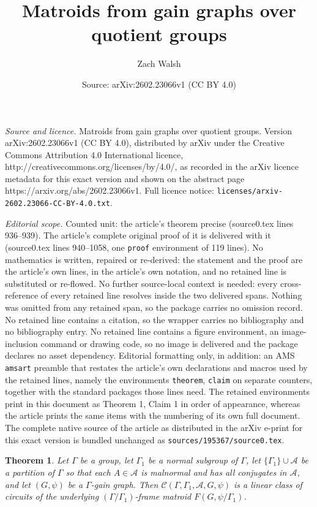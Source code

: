 \documentclass[10pt,a4paper]{amsart}
\title{Matroids from gain graphs over quotient groups}
\author{Zach Walsh}
\date{Source: arXiv:2602.23066v1 (CC BY 4.0)}
\newtheorem{theorem}{Theorem}
\newcommand{\cA}{\mathcal{A}}
\newcommand{\cC}{\mathcal{C}}
\begin{document}
\maketitle

\noindent\emph{Source and licence.} Matroids from gain graphs over quotient groups. Version arXiv:2602.23066v1 (CC BY 4.0), distributed by arXiv under the Creative Commons Attribution 4.0 International licence, http://creativecommons.org/licenses/by/4.0/, as recorded in the arXiv licence metadata for this exact version and shown on the abstract page https://arxiv.org/abs/2602.23066v1. Full licence notice: \texttt{licenses/arxiv-2602.23066-CC-BY-4.0.txt}.\par\smallskip

\noindent\textit{Editorial scope.} Counted unit: the article's theorem precise (source0.tex lines 936--939). The article's complete original proof of it is delivered with it (source0.tex lines 940--1058, one \texttt{proof} environment of 119 lines). No mathematics is written, repaired or re-derived: the statement and the proof are the article's own lines, in the article's own notation, and no retained line is substituted or re-flowed.  No further source-local context is needed: every cross-reference of every retained line resolves inside the two delivered spans.  Nothing was omitted from any retained span, so the package carries no omission record.  No retained line contains a citation, so the wrapper carries no bibliography and no bibliography entry.  No retained line contains a figure environment, an image-inclusion command or drawing code, so no image is delivered and the package declares no asset dependency.  Editorial formatting only, in addition: an AMS \texttt{amsart} preamble that restates the article's own declarations and macros used by the retained lines, namely the environments \texttt{theorem}, \texttt{claim} on separate counters, together with the standard packages those lines need.  The retained environments print in this document as Theorem 1, Claim 1 in order of appearance, whereas the article prints the same items with the numbering of its own full document.  The complete native source of the article as distributed in the arXiv e-print for this exact version is bundled unchanged as \texttt{sources/195367/source0.tex}.
\begin{theorem} \label{thm: main precise}
Let $\Gamma$ be a group, let $\Gamma_1$ be a normal subgroup of $\Gamma$, let $\{\Gamma_1\} \cup \cA$ be a partition of $\Gamma$ so that each $A \in \cA$ is malnormal and has all conjugates in $\cA$, and let $(G, \psi)$ be a $\Gamma$-gain graph.
Then $\cC(\Gamma, \Gamma_1, \cA, G, \psi)$ is a linear class of circuits of the underlying $(\Gamma/\Gamma_1)$-frame matroid $F(G, \psi/\Gamma_1)$.
\end{theorem}
\end{document}
